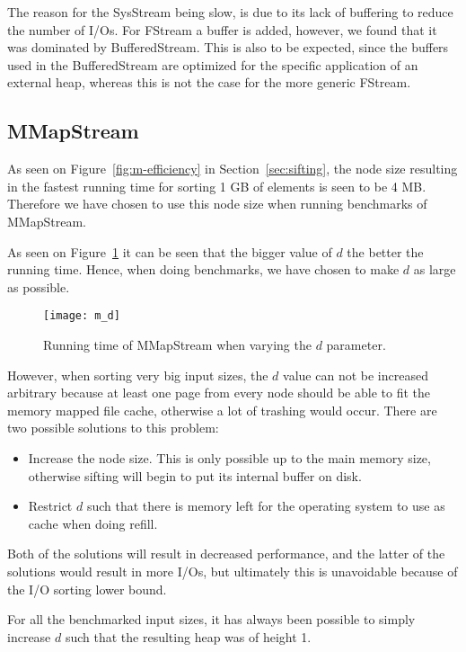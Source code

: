 The reason for the SysStream being slow, is due to its lack of buffering to reduce the number of I/Os. For FStream a buffer is added, however, we found that it was dominated by BufferedStream. This is also to be expected, since the buffers used in the BufferedStream are optimized for the specific application of an external heap, whereas this is not the case for the more generic FStream.

\subsection{MMapStream}
As seen on Figure~\ref{fig:m-efficiency} in Section~\ref{sec:sifting}, the node size resulting in the fastest running time for sorting 1 GB of elements is seen to be 4 MB. Therefore we have chosen to use this node size when running benchmarks of MMapStream.

As seen on Figure~\ref{fig:m:vary-d} it can be seen that the bigger value of $d$ the better the running time. Hence, when doing benchmarks, we have chosen to make $d$ as large as possible. 

\begin{figure}[h!]
  \centering
  \texttt{[image: m\_d]}
  \caption{Running time of MMapStream when varying the $d$ parameter.}
  \label{fig:m:vary-d}
\end{figure}

However, when sorting very big input sizes, the $d$ value can not be increased arbitrary because at least one page from every node should be able to fit the memory mapped file cache, otherwise a lot of trashing would occur. There are two possible solutions to this problem:
\begin{itemize}
\item Increase the node size. This is only possible up to the main memory size, otherwise sifting will begin to put its internal buffer on disk.
\item Restrict $d$ such that there is memory left for the operating system to use as cache when doing refill.
\end{itemize}
Both of the solutions will result in decreased performance, and the latter of the solutions would result in more I/Os, but ultimately this is unavoidable because of the I/O sorting lower bound.

For all the benchmarked input sizes, it has always been possible to simply increase $d$ such that the resulting heap was of height 1.

